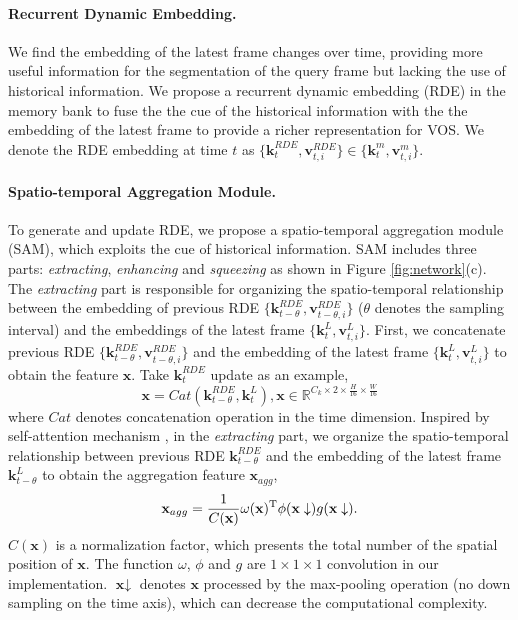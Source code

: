 \documentclass[10pt,twocolumn,letterpaper]{article}
\begin{document}
\paragraph{Recurrent Dynamic Embedding.}
We find the embedding of the latest frame changes over time, providing more useful information for the segmentation of the query frame but lacking the use of historical information. We propose a recurrent dynamic embedding (RDE) in the memory bank to fuse the the cue of the historical information with the the embedding of the latest frame to provide a richer representation for VOS. We denote the RDE embedding at time $t$ as $\{\textbf{k}^{RDE}_{t}, \textbf{v}^{RDE}_{t,i}\} \in \{\textbf{k}^m_{t}, \textbf{v}^m_{t,i}\}$.  
\paragraph{Spatio-temporal Aggregation Module.} 
To generate and update RDE, we propose a spatio-temporal aggregation module (SAM), which exploits the cue of historical information.  SAM includes three parts: \textit{extracting}, \textit{enhancing} and \textit{squeezing} as shown in Figure \ref{fig:network}(c). The \textit{extracting} part is responsible for organizing the spatio-temporal relationship between the embedding of previous RDE $\{\textbf{k}^{RDE}_{t-\theta}, \textbf{v}^{RDE}_{t-\theta,i}\}$ ($\theta$ denotes the sampling interval) and the embeddings of the latest frame $\{\textbf{k}^L_{t}, \textbf{v}^L_{t,i}\}$. First, we concatenate previous RDE $\{\textbf{k}^{RDE}_{t-\theta}, \textbf{v}^{RDE}_{t-\theta,i}\}$ and the embedding of the latest frame $\{\textbf{k}^L_{t}, \textbf{v}^L_{t,i}\}$ to obtain the feature $\textbf{x}$. Take $\textbf{k}^{RDE}_t$ update as an example,  
\begin{equation}
    \textbf{x} = Cat(\textbf{k}^{RDE}_{t-\theta}, \textbf{k}^L_{t}), \textbf{x} \in \mathbb{R}^{C_k \times 2 \times \frac{H}{16} \times \frac{W}{16}}
\end{equation}
where $Cat$ denotes concatenation operation in the time dimension. Inspired by self-attention mechanism \cite{wang2018non}, in the \textit{extracting} part, we organize the spatio-temporal relationship between  previous RDE $\textbf{k}^{RDE}_{t-\theta}$ and the embedding of the latest frame $\textbf{k}^{L}_{t-\theta}$ to obtain the aggregation feature $\textbf{x}_{agg}$,
\begin{equation}
    \textbf{x}_{agg} = \frac{1}{C(\textbf{x})}\omega(\textbf{x})^\mathrm{T} \phi(\textbf{\textbf{x}}\downarrow) g(\textbf{x}\downarrow). 
\end{equation} 
$C(\textbf{x})$ is a normalization factor, which presents the total number of the spatial position of $\textbf{x}$. The function $\omega$, $\phi$ and $g$ are $1\times 1 \times 1$ convolution in our implementation. $\textbf{x} \downarrow$ denotes $\textbf{x}$ processed by the max-pooling operation (no down sampling on the time axis), which can decrease the computational complexity. 
\end{document}
